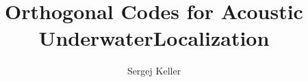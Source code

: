 \documentclass[en,abstract,acknowledgment,symbollist,inputenc=utf8]{tuhhthesis}
\author{Sergej Keller}
\title{Orthogonal Codes for Acoustic UnderwaterLocalization}
\institute{InstAutonomousCPS}
\begin{document}





%
%
%
%
%




\begin{tuhhappendix}
  
\end{tuhhappendix}


\end{document}
